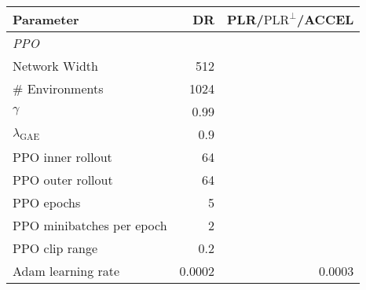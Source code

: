 \documentclass{article}
\theoremstyle{plain}
\theoremstyle{definition}
\theoremstyle{remark}
\begin{document}
\begin{table}[H]
\begin{center}
{\begin{tabular}{lrr}
        \textbf{Parameter}              & DR        & PLR/$\text{PLR}^\perp$/ACCEL\\
        \midrule
        \emph{PPO}                      &\\
        Network Width                   & 512       &\\
        \# Environments                 & 1024      &           \\
        $\gamma$                        & 0.99      &           \\
        $\lambda_{\text{GAE}}$          & 0.9       &           \\
        PPO inner rollout               & 64        &           \\
        PPO outer rollout               & 64        &           \\
        PPO epochs                      & 5         &           \\
        PPO minibatches per epoch       & 2         &           \\
        PPO clip range                  & 0.2       &           \\
        Adam learning rate              & 0.0002    & 0.0003           \\

\end{tabular}}
\end{center}
\end{table}
\end{document}
